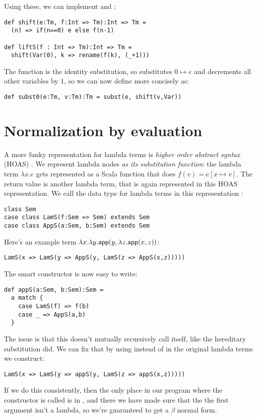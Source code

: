 Using these, we can implement  and :

\begin{lstlisting}
def shift(e:Tm, f:Int => Tm):Int => Tm =
  (n) => if(n==0) e else f(n-1)

def liftS(f : Int => Tm):Int => Tm =
  shift(Var(0), k => rename(f(k), (_+1)))
\end{lstlisting}

The function  is the identity substitution, so  substitutes $0 \mapsto e$ and decrements all other variables by $1$, so we can now define  more concisely as:

\begin{lstlisting}
def subst0(e:Tm, v:Tm):Tm = subst(e, shift(v,Var))
\end{lstlisting}

\section{Normalization by evaluation}

A more funky representation for lambda terms is \emph{higher order abstract syntax} (HOAS) \cite{pfenning88}.
We represent lambda nodes \emph{as its substitution function}: the lambda term $\lambda x. e$ gets represented as a Scala function that does $f(v) = e[x \mapsto v]$.
The return value is another lambda term, that is again represented in this HOAS representation.
We call the data type for lambda terms in this representation :

\begin{lstlisting}
class Sem
case class LamS(f:Sem => Sem) extends Sem
case class AppS(a:Sem, b:Sem) extends Sem
\end{lstlisting}

Here's an example term $\lambda x. \lambda y. \mathsf{app}(y, \lambda z. \mathsf{app}(x,z))$:
\begin{lstlisting}
LamS(x => LamS(y => AppS(y, LamS(z => AppS(x,z)))))
\end{lstlisting}

The smart constructor  is now easy to write:
\begin{lstlisting}
def appS(a:Sem, b:Sem):Sem =
  a match {
    case LamS(f) => f(b)
    case _ => AppS(a,b)
  }
\end{lstlisting}

The issue is that this doesn't mutually recursively call itself, like the hereditary substitution did.
We can fix that by using  instead of  in the original lambda terms we construct:
\begin{lstlisting}
LamS(x => LamS(y => appS(y, LamS(z => appS(x,z)))))
\end{lstlisting}
If we do this consistently, then the only place in our program where the constructor  is called is in , and there we have made sure that the the first argument isn't a lambda, so we're guaranteed to get a $\beta$ normal form.

